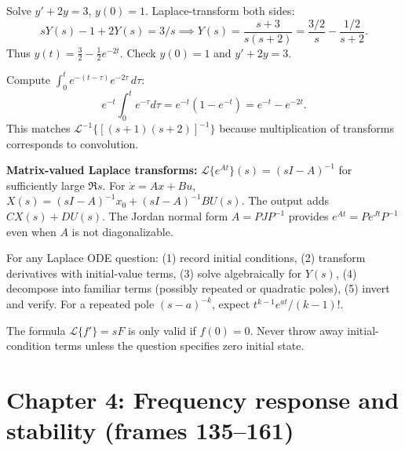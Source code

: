 \documentclass[10pt,a4paper]{article}
\newcommand{\Lap}{\mathcal{L}}\newcommand{\CC}{\mathbb{C}}\newcommand{\RR}{\mathbb{R}}
\begin{document}
\begin{workbox}[title={WORKED: nonzero initial conditions}]
Solve $y'+2y=3$, $y(0)=1$. Laplace-transform both sides:
\[sY(s)-1+2Y(s)=3/s \implies Y(s)=\frac{s+3}{s(s+2)}=\frac{3/2}{s}-\frac{1/2}{s+2}.\]
Thus $\boxed{y(t)=\tfrac32-\tfrac12e^{-2t}}$. Check $y(0)=1$ and $y'+2y=3$.
\end{workbox}
\begin{workbox}[title={WORKED: convolution integral}]
Compute $\int_0^t e^{-(t-\tau)}e^{-2\tau}\,d\tau$:
\[e^{-t}\int_0^t e^{-\tau}d\tau=e^{-t}(1-e^{-t})=e^{-t}-e^{-2t}.\]
This matches $\Lap^{-1}\{[(s+1)(s+2)]^{-1}\}$ because multiplication of transforms corresponds to convolution.
\end{workbox}
\begin{formbox}\textbf{Matrix-valued Laplace transforms:} $\Lap\{e^{At}\}(s)=(sI-A)^{-1}$ for sufficiently large $\Re s$. For $\dot x=Ax+Bu$, $X(s)=(sI-A)^{-1}x_0+(sI-A)^{-1}BU(s)$. The output adds $CX(s)+DU(s)$. The Jordan normal form $A=PJP^{-1}$ provides $e^{At}=Pe^{Jt}P^{-1}$ even when $A$ is not diagonalizable.
\end{formbox}
\begin{exambox}For any Laplace ODE question: (1) record initial conditions, (2) transform derivatives with initial-value terms, (3) solve algebraically for $Y(s)$, (4) decompose into familiar terms (possibly repeated or quadratic poles), (5) invert and verify. For a repeated pole $(s-a)^{-k}$, expect $t^{k-1}e^{at}/(k-1)!$.\end{exambox}
\begin{warnbox}The formula $\Lap\{f'\}=sF$ is only valid if $f(0)=0$. Never throw away initial-condition terms unless the question specifies zero initial state.\end{warnbox}


\section{Chapter 4: Frequency response and stability (frames 135--161)}
\end{document}
